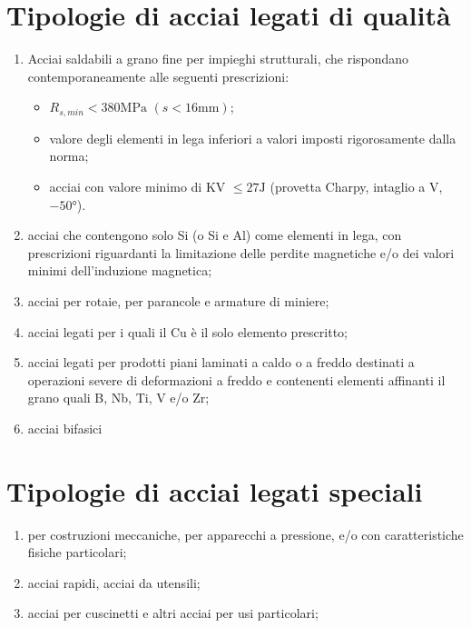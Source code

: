 \section{Tipologie di acciai legati di qualità}\label{sec:ALDQ}
\begin{enumerate}
\item Acciai saldabili a grano fine per impieghi strutturali, che rispondano contemporaneamente alle seguenti prescrizioni:
	\begin{itemize}
	\item $R_{s,min} < 380\unit{\MPa}$ $(s < 16\unit{\mm})$;
	\item valore degli elementi in lega inferiori a valori imposti rigorosamente dalla norma;
	\item acciai con valore minimo di KV $\leq 27\unit{\J}$ (provetta Charpy, intaglio a V, $-50\unit{\degree}$).
	\end{itemize}
\item acciai che contengono solo Si (o Si e Al) come elementi in lega, con prescrizioni riguardanti la limitazione delle perdite magnetiche e/o dei valori minimi dell'induzione magnetica;
\item acciai per rotaie, per parancole e armature di miniere;
\item acciai legati per i quali il Cu è il solo elemento prescritto;
\item acciai legati per prodotti piani laminati a caldo o a freddo destinati a operazioni severe di deformazioni a freddo e contenenti elementi affinanti il grano quali B, Nb, Ti, V e/o Zr;
\item acciai bifasici
\end{enumerate}

\section{Tipologie di acciai legati speciali}\label{sec:ALS}
\begin{enumerate}
\item per costruzioni meccaniche, per apparecchi a pressione, e/o con caratteristiche fisiche particolari;
\item acciai rapidi, acciai da utensili;
\item acciai per cuscinetti e altri acciai per usi particolari;
\end{enumerate}


